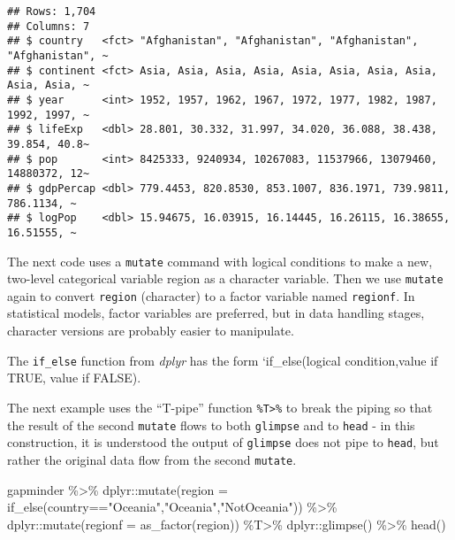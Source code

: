 \documentclass[
]{book}
\newenvironment{Shaded}{\begin{snugshade}}{\end{snugshade}}
\newcommand{\AttributeTok}[1]{\textcolor[rgb]{0.77,0.63,0.00}{#1}}
\newcommand{\FunctionTok}[1]{\textcolor[rgb]{0.00,0.00,0.00}{#1}}
\newcommand{\NormalTok}[1]{#1}
\newcommand{\SpecialCharTok}[1]{\textcolor[rgb]{0.00,0.00,0.00}{#1}}
\newcommand{\StringTok}[1]{\textcolor[rgb]{0.31,0.60,0.02}{#1}}
\begin{document}
\begin{verbatim}
## Rows: 1,704
## Columns: 7
## $ country   <fct> "Afghanistan", "Afghanistan", "Afghanistan", "Afghanistan", ~
## $ continent <fct> Asia, Asia, Asia, Asia, Asia, Asia, Asia, Asia, Asia, Asia, ~
## $ year      <int> 1952, 1957, 1962, 1967, 1972, 1977, 1982, 1987, 1992, 1997, ~
## $ lifeExp   <dbl> 28.801, 30.332, 31.997, 34.020, 36.088, 38.438, 39.854, 40.8~
## $ pop       <int> 8425333, 9240934, 10267083, 11537966, 13079460, 14880372, 12~
## $ gdpPercap <dbl> 779.4453, 820.8530, 853.1007, 836.1971, 739.9811, 786.1134, ~
## $ logPop    <dbl> 15.94675, 16.03915, 16.14445, 16.26115, 16.38655, 16.51555, ~
\end{verbatim}

The next code uses a \texttt{mutate} command with logical conditions to make a new, two-level categorical variable region as a character variable. Then we use \texttt{mutate} again to convert \texttt{region} (character) to a factor variable named \texttt{regionf}. In statistical models, factor variables are preferred, but in data handling stages, character versions are probably easier to manipulate.

The \texttt{if\_else} function from \emph{dplyr} has the form `if\_else(logical condition,value if TRUE, value if FALSE).

The next example uses the ``T-pipe'' function \texttt{\%T\textgreater{}\%} to break the piping so that the result of the second \texttt{mutate} flows to both \texttt{glimpse} and to \texttt{head} - in this construction, it is understood the output of \texttt{glimpse} does not pipe to \texttt{head}, but rather the original data flow from the second \texttt{mutate}.

\begin{Shaded}
\begin{Highlighting}[]
\NormalTok{gapminder }\SpecialCharTok{\%\textgreater{}\%} 
\NormalTok{  dplyr}\SpecialCharTok{::}\FunctionTok{mutate}\NormalTok{(}\AttributeTok{region =} \FunctionTok{if\_else}\NormalTok{(country}\SpecialCharTok{==}\StringTok{"Oceania"}\NormalTok{,}\StringTok{"Oceania"}\NormalTok{,}\StringTok{"NotOceania"}\NormalTok{)) }\SpecialCharTok{\%\textgreater{}\%}
\NormalTok{  dplyr}\SpecialCharTok{::}\FunctionTok{mutate}\NormalTok{(}\AttributeTok{regionf =} \FunctionTok{as\_factor}\NormalTok{(region)) }\SpecialCharTok{\%T\textgreater{}\%}
\NormalTok{  dplyr}\SpecialCharTok{::}\FunctionTok{glimpse}\NormalTok{() }\SpecialCharTok{\%\textgreater{}\%}
  \FunctionTok{head}\NormalTok{()}
\end{Highlighting}
\end{Shaded}
\end{document}
